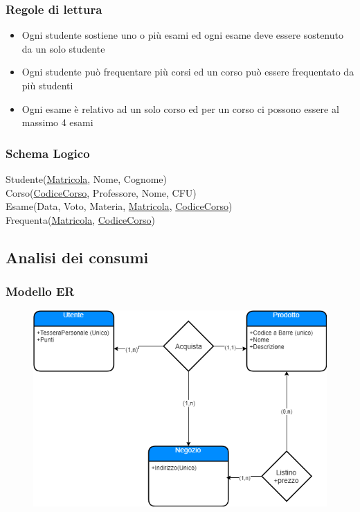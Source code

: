 \documentclass{article}
\begin{document}
	\subsubsection{Regole di lettura}
	\begin{itemize}
		\item Ogni studente sostiene uno o più esami ed ogni esame deve essere sostenuto da un solo studente
		\item Ogni studente può frequentare più corsi ed un corso può essere frequentato da più studenti
		\item Ogni esame è relativo ad un solo corso ed per un corso ci possono essere al massimo 4 esami
	\end{itemize}
	\subsubsection{Schema Logico}
	Studente(\underline{Matricola}, Nome, Cognome)\\
	Corso(\underline{CodiceCorso}, Professore, Nome, CFU)\\
	Esame(Data, Voto, Materia, \underline{Matricola}, \underline{CodiceCorso})\\
	Frequenta(\underline{Matricola}, \underline{CodiceCorso})

	\pagebreak
	
	\subsection{Analisi dei consumi}
	\subsubsection{Modello ER}
	\begin{figure}[h!]
		\centering
		\includegraphics[scale=0.5]{images/AnalisiConsumi.png}
	\end{figure}
\end{document}
